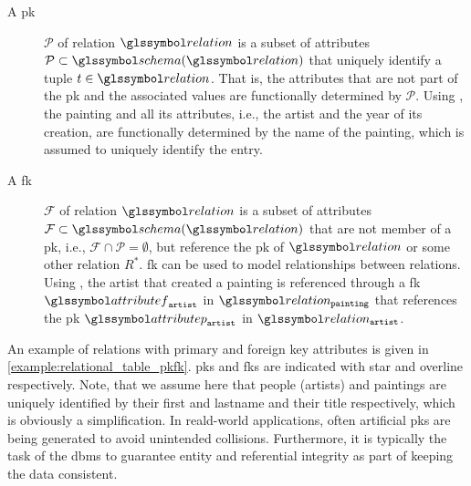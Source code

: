 \begin{description}
    \item[A \acrfull{pk}] $\mathcal{P}$ of relation $\relation$ is a subset of attributes $\mathcal{P} \subset \schema(\relation)$ that uniquely identify a tuple $t \in \relation$. That is, the attributes that are not part of the \acrshort{pk} and the associated values are functionally determined by $\mathcal{P}$. Using , the painting and all its attributes, i.e., the artist and the year of its creation, are functionally determined by the name of the painting, which is assumed to uniquely identify the entry.
 
    \item[A \acrfull{fk}] $\mathcal{F}$ of relation $\relation$ is a subset of attributes $\mathcal{F} \subset \schema(\relation)$ that are not member of a \acrshort{pk}, i.e., $ \mathcal{F} \cap \mathcal{P} = \emptyset$, but reference the \acrshort{pk} of $\relation$ or some other relation $R^{*}$. \acrshort{fk} can be used to model relationships between relations. Using , the artist that created a painting is referenced through a \acrshort{fk} $\attributef_{\mathtt{artist}}$ in $\relation_{\mathtt{painting}}$ that references the \acrshort{pk} $\attributep_{\mathtt{artist}}$ in $\relation_{\mathtt{artist}}$.
\end{description}

An example of relations with primary and foreign key attributes is given in \cref{example:relational_table_pkfk}. \acrshort{pk}s and \acrshort{fk}s are indicated with star and overline respectively. Note, that we assume here that people (artists) and paintings are uniquely identified by their first and lastname and their title respectively, which is obviously a simplification. In reald-world applications, often artificial \acrshort{pk}s are being generated to avoid unintended collisions. Furthermore, it is typically the task of the \acrshort{dbms} to guarantee entity and referential integrity as part of keeping the data consistent.

